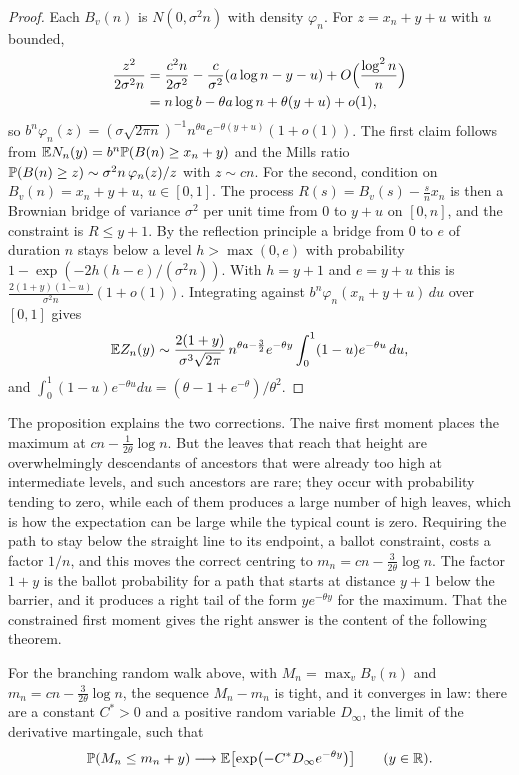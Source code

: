 \begin{proof}
Each $B_v(n)$ is $N(0,\sigma^2n)$ with density $\varphi_n$. For $z=x_n+y+u$ with $u$ bounded,
\begin{align*}
\frac{z^2}{2\sigma^2n}&=\frac{c^2n}{2\sigma^2}-\frac{c}{\sigma^2}(a\log n-y-u)+O\Bigl(\frac{\log^2n}{n}\Bigr)\\
&=n\log b-\theta a\log n+\theta(y+u)+o(1),
\end{align*}
so $b^n\varphi_n(z)=(\sigma\sqrt{2\pi n})^{-1}n^{\theta a}e^{-\theta(y+u)}(1+o(1))$. The first claim follows from $\mathbb{E} N_n(y)=b^n\mathbb{P}(B(n)\ge x_n+y)$ and the Mills ratio $\mathbb{P}(B(n)\ge z)\sim\sigma^2n\,\varphi_n(z)/z$ with $z\sim cn$. For the second, condition on $B_v(n)=x_n+y+u$, $u\in[0,1]$. The process $R(s)=B_v(s)-\frac snx_n$ is then a Brownian bridge of variance $\sigma^2$ per unit time from $0$ to $y+u$ on $[0,n]$, and the constraint is $R\le y+1$. By the reflection principle a bridge from $0$ to $e$ of duration $n$ stays below a level $h>\max(0,e)$ with probability $1-\exp(-2h(h-e)/(\sigma^2n))$. With $h=y+1$ and $e=y+u$ this is $\frac{2(1+y)(1-u)}{\sigma^2n}(1+o(1))$. Integrating against $b^n\varphi_n(x_n+y+u)\,du$ over $[0,1]$ gives
\[
\mathbb{E} Z_n(y)\sim\frac{2(1+y)}{\sigma^3\sqrt{2\pi}}\,n^{\theta a-\frac32}e^{-\theta y}\int_0^1(1-u)e^{-\theta u}\,du,
\]
and $\int_0^1(1-u)e^{-\theta u}du=(\theta-1+e^{-\theta})/\theta^2$.
\end{proof}

The proposition explains the two corrections. The naive first moment places the maximum at $cn-\frac1{2\theta}\log n$. But the leaves that reach that height are overwhelmingly descendants of ancestors that were already too high at intermediate levels, and such ancestors are rare; they occur with probability tending to zero, while each of them produces a large number of high leaves, which is how the expectation can be large while the typical count is zero. Requiring the path to stay below the straight line to its endpoint, a ballot constraint, costs a factor $1/n$, and this moves the correct centring to $m_n=cn-\frac{3}{2\theta}\log n$. The factor $1+y$ is the ballot probability for a path that starts at distance $y+1$ below the barrier, and it produces a right tail of the form $ye^{-\theta y}$ for the maximum. That the constrained first moment gives the right answer is the content of the following theorem.

\begin{theorem}\label{thm:09bbrw}
For the branching random walk above, with $M_n=\max_vB_v(n)$ and $m_n=cn-\frac{3}{2\theta}\log n$, the sequence $M_n-m_n$ is tight, and it converges in law: there are a constant $C^*>0$ and a positive random variable $D_\infty$, the limit of the derivative martingale, such that
\[
\mathbb{P}(M_n\le m_n+y)\longrightarrow\mathbb{E}\bigl[\exp\bigl(-C^*D_\infty e^{-\theta y}\bigr)\bigr]\qquad(y\in\mathbb{R}).
\]
\end{theorem}

